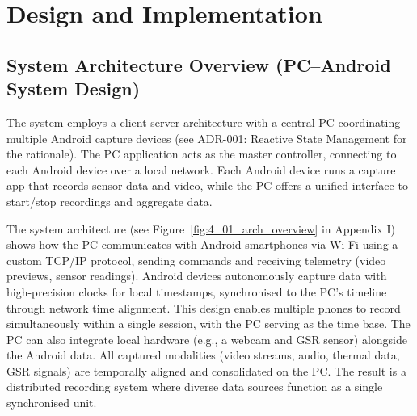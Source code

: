 \chapter{Design and Implementation}\label{chap:design-implementation}


\section{System Architecture Overview (PC--Android System Design)}\label{sec:4-1}
The system employs a client-server architecture with a central PC coordinating multiple Android capture devices (see ADR-001: Reactive State Management for the rationale). The PC application acts as the master controller, connecting to each Android device over a local network. Each Android device runs a capture app that records sensor data and video, while the PC offers a unified interface to start/stop recordings and aggregate data.

The system architecture (see Figure~\ref{fig:4_01_arch_overview} in Appendix I) shows how the PC communicates with Android smartphones via Wi-Fi using a custom TCP/IP protocol, sending commands and receiving telemetry (video previews, sensor readings). Android devices autonomously capture data with high-precision clocks for local timestamps, synchronised to the PC's timeline through network time alignment. This design enables multiple phones to record simultaneously within a single session, with the PC serving as the time base. The PC can also integrate local hardware (e.g., a webcam and GSR sensor) alongside the Android data. All captured modalities (video streams, audio, thermal data, GSR signals) are temporally aligned and consolidated on the PC. The result is a distributed recording system where diverse data sources function as a single synchronised unit.


